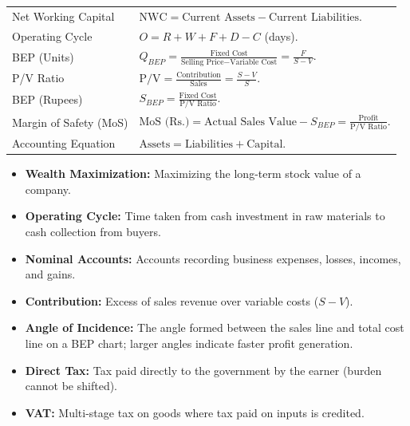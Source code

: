 \documentclass[12pt,a4paper]{article}
\renewcommand{\arraystretch}{1.45}
\begin{document}
\begin{tcolorbox}[formulabox, title={\textbf{Key Concepts \& Equations}}]
\renewcommand{\arraystretch}{1.4}
\begin{tabularx}{\linewidth}{B{4.0cm} X}
Net Working Capital & $\text{NWC} = \text{Current Assets} - \text{Current Liabilities}$. \\
Operating Cycle & $O = R + W + F + D - C$ (days). \\
BEP (Units) & $Q_{BEP} = \frac{\text{Fixed Cost}}{\text{Selling Price} - \text{Variable Cost}} = \frac{F}{S - V}$. \\
P/V Ratio & $\text{P/V} = \frac{\text{Contribution}}{\text{Sales}} = \frac{S - V}{S}$. \\
BEP (Rupees) & $S_{BEP} = \frac{\text{Fixed Cost}}{\text{P/V Ratio}}$. \\
Margin of Safety (MoS) & $\text{MoS (Rs.)} = \text{Actual Sales Value} - S_{BEP} = \frac{\text{Profit}}{\text{P/V Ratio}}$. \\
Accounting Equation & $\text{Assets} = \text{Liabilities} + \text{Capital}$. \\
\end{tabularx}
\end{tcolorbox}

\begin{tcolorbox}[defbox, title={\textbf{One-Line Definitions}}]
\begin{itemize}[leftmargin=*, itemsep=2.5pt, topsep=0pt]
  \item \textbf{Wealth Maximization:} Maximizing the long-term stock value of a company.
  \item \textbf{Operating Cycle:} Time taken from cash investment in raw materials to cash collection from buyers.
  \item \textbf{Nominal Accounts:} Accounts recording business expenses, losses, incomes, and gains.
  \item \textbf{Contribution:} Excess of sales revenue over variable costs ($S - V$).
  \item \textbf{Angle of Incidence:} The angle formed between the sales line and total cost line on a BEP chart; larger angles indicate faster profit generation.
  \item \textbf{Direct Tax:} Tax paid directly to the government by the earner (burden cannot be shifted).
  \item \textbf{VAT:} Multi-stage tax on goods where tax paid on inputs is credited.
\end{itemize}
\end{tcolorbox}
\end{document}
